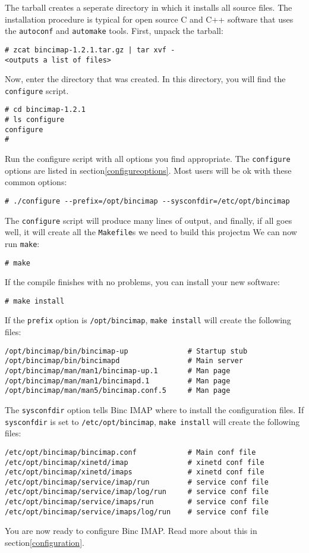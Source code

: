 \documentclass[11pt,a4paper,twoside,openright]{report}
\begin{document}
The tarball creates a seperate directory in which it installs all
source files. The installation procedure is typical for open source C
and C++ software that uses the \texttt{autoconf} and \texttt{automake}
tools. First, unpack the tarball:

\begin{Verbatim}
# zcat bincimap-1.2.1.tar.gz | tar xvf -
<outputs a list of files>
\end{Verbatim}
Now, enter the directory that was created. In this directory, you will
find the \texttt{configure} script.

\begin{Verbatim}
# cd bincimap-1.2.1
# ls configure
configure
#
\end{Verbatim}
Run the configure script with all options you find appropriate. The
\texttt{configure} options are listed in
section\vref{configureoptions}. Most users will be ok with these
common options:

\begin{Verbatim}
# ./configure --prefix=/opt/bincimap --sysconfdir=/etc/opt/bincimap
\end{Verbatim}
The \texttt{configure} script will produce many lines of output, and
finally, if all goes well, it will create all the \texttt{Makefile}s
we need to build this projectm We can now run \texttt{make}:

\begin{Verbatim}
# make
\end{Verbatim}
If the compile finishes with no problems, you can install your new
software:

\begin{Verbatim}
# make install
\end{Verbatim}
If the \texttt{prefix} option is \texttt{/opt/bincimap}, \texttt{make
install} will create the following files:

\begin{Verbatim}
/opt/bincimap/bin/bincimap-up              # Startup stub
/opt/bincimap/bin/bincimapd                # Main server
/opt/bincimap/man/man1/bincimap-up.1       # Man page
/opt/bincimap/man/man1/bincimapd.1         # Man page
/opt/bincimap/man/man5/bincimap.conf.5     # Man page
\end{Verbatim}
The \texttt{sysconfdir} option tells Binc IMAP where to install the
configuration files. If \texttt{sysconfdir} is set to
\texttt{/etc/opt/bincimap}, \texttt{make install} will create the
following files:

\begin{Verbatim}
/etc/opt/bincimap/bincimap.conf            # Main conf file
/etc/opt/bincimap/xinetd/imap              # xinetd conf file
/etc/opt/bincimap/xinetd/imaps             # xinetd conf file
/etc/opt/bincimap/service/imap/run         # service conf file
/etc/opt/bincimap/service/imap/log/run     # service conf file
/etc/opt/bincimap/service/imaps/run        # service conf file
/etc/opt/bincimap/service/imaps/log/run    # service conf file
\end{Verbatim}
You are now ready to configure Binc IMAP. Read more about this in
section\vref{configuration}.
\end{document}
